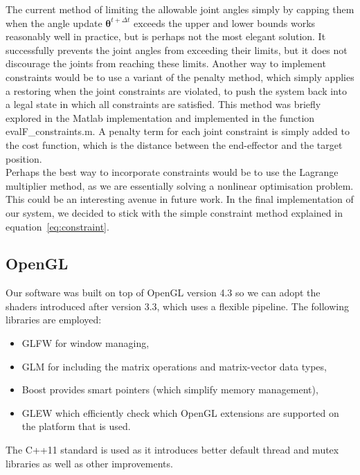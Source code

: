 \documentclass[paper=a4, fontsize=11pt]{scrartcl} %
\numberwithin{equation}{section} %
\numberwithin{figure}{section} %
\numberwithin{table}{section} %
\newcommand{\params}{\boldsymbol{\theta}}
\begin{document}
The current method of limiting the allowable joint angles simply by capping them when the angle update $\params^{t+\Delta t}$ exceeds the upper and lower bounds works reasonably well in practice, but is perhaps not the most elegant solution. It successfully prevents the joint angles from exceeding their limits, but it does not discourage the joints from reaching these limits. Another way to implement constraints would be to use a variant of the penalty method, which simply applies a restoring when the joint constraints are violated, to push the system back into a legal state in which all constraints are satisfied. This method was briefly explored in the Matlab implementation and implemented in the function evalF\_constraints.m. A penalty term for each joint constraint is simply added to the cost function, which is the distance between the end-effector and the target position. \\

Perhaps the best way to incorporate constraints would be to use the Lagrange multiplier method, as we are essentially solving a nonlinear optimisation problem. This could be an interesting avenue in future work. In the final implementation of our system, we decided to stick with the simple constraint method explained in equation~\ref{eq:constraint}.

\subsection{ OpenGL}

% 
Our software was built on top of OpenGL version 4.3 so we can adopt the shaders introduced after version 3.3, which uses a flexible pipeline. The following libraries are employed: 
\begin{itemize}
\item GLFW for window managing, 
\item GLM  for including the matrix operations and matrix-vector data types, 
\item Boost provides smart pointers (which simplify memory management), 
\item GLEW which efficiently check which OpenGL extensions are supported on the platform that is used. 
\end{itemize}
The C++11 standard is used as it introduces better default thread and mutex libraries as well as other improvements. \\
\end{document}
